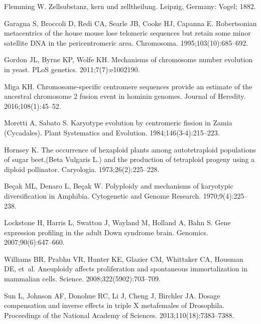 \documentclass[]{rsos}%
\begin{document}
\vspace*{-10pt}

\noindent 

\newpage
\begin{thebibliography}{99}

Flemming W. 
 Zellsubstanz, kern und zelltheilung. Leipzig, Germany: Vogel; 1882.

Garagna S, Broccoli D, Redi CA, Searle JB, Cooke HJ, Capanna E.
 Robertsonian metacentrics of the house mouse lose telomeric sequences
  but retain some minor satellite DNA in the pericentromeric area.
 Chromosoma. 1995;103(10):685--692.

Gordon JL, Byrne KP, Wolfe KH.
 Mechanisms of chromosome number evolution in yeast.
 PLoS genetics. 2011;7(7):e1002190.

Miga KH.
 Chromosome-specific centromere sequences provide an estimate of the
  ancestral chromosome 2 fusion event in hominin genomes.
 Journal of Heredity. 2016;108(1):45--52.

Moretti A, Sabato S.
 Karyotype evolution by centromeric fission in Zamia (Cycadales).
 Plant Systematics and Evolution. 1984;146(3-4):215--223.

Hornsey K.
 The occurrence of hexaploid plants among autotetraploid populations
  of sugar beet,(Beta Vulgaris L.) and the production of tetraploid progeny
  using a diploid pollinator.
 Caryologia. 1973;26(2):225--228.

Be{\c{c}}ak ML, Denaro L, Be{\c{c}}ak W.
 Polyploidy and mechanisms of karyotypic diversification in Amphibia.
 Cytogenetic and Genome Research. 1970;9(4):225--238.

Lockstone H, Harris L, Swatton J, Wayland M, Holland A, Bahn S.
 Gene expression profiling in the adult Down syndrome brain.
 Genomics. 2007;90(6):647--660.

Williams BR, Prabhu VR, Hunter KE, Glazier CM, Whittaker CA, Housman DE, et~al.
 Aneuploidy affects proliferation and spontaneous immortalization in
  mammalian cells.
 Science. 2008;322(5902):703--709.

Sun L, Johnson AF, Donohue RC, Li J, Cheng J, Birchler JA.
 Dosage compensation and inverse effects in triple X metafemales of
  Drosophila.
 Proceedings of the National Academy of Sciences.
  2013;110(18):7383--7388.


\end{thebibliography}
\end{document}
